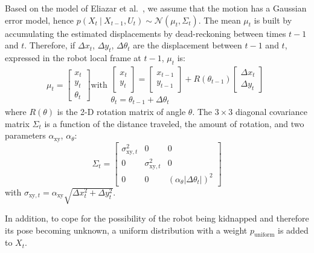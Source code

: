 \documentclass[letterpaper, 10pt, conference]{ieeeconf}
\begin{document}
Based on the model of Eliazar et al.~\cite{eliazar2004motionmodel}, we assume that the motion has a Gaussian error model, hence $p(X_t~|~X_{t-1}, U_{t})\sim\mathcal{N}(\mu_t,\Sigma_t)$.
The mean $\mu_t$ is built by accumulating the estimated displacements by dead-reckoning between times $t-1$ and $t$.
Therefore, if $\Delta x_t$, $\Delta y_t$, $\Delta \theta_t$ are the displacement between $t-1$ and $t$, expressed in the robot local frame at $t-1$, $\mu_t$ is:
\begin{equation*}
\mu_t =
\left[ \begin{array}{c} x_t \\ y_t \\ \theta_t \end{array} \right]
\text{with}
\begin{array}{c}
\left[ \begin{array}{c} x_t \\ y_t \end{array} \right] =
\left[ \begin{array}{c} x_{t-1} \\ y_{t-1} \end{array} \right] +
R(\theta_{t-1})
\left[ \begin{array}{c} \Delta x_{t} \\ \Delta y_{t} \end{array} \right]
\\
\theta_t = \theta_{t-1} + \Delta \theta_t
\end{array}
\end{equation*}
where $R(\theta)$ is the 2-D rotation matrix of angle $\theta$.
The $3\times3$ diagonal covariance matrix $\Sigma_t$ is a function of the distance traveled, the amount of rotation, and two parameters $\alpha_\mathrm{xy}$, $\alpha_\theta$:
\begin{equation*}
\Sigma_t=\begin{bmatrix} \sigma_{\mathrm{xy},t}^2 & 0 & 0 \\ 0 & \sigma_{\mathrm{xy},t}^2 & 0 \\ 0 & 0 & (\alpha_\theta | \Delta \theta_t |)^2 \end{bmatrix}
\end{equation*}
with $ \sigma_{\mathrm{xy},t} = \alpha_\mathrm{xy} \sqrt{\Delta x_{t}^2 + \Delta y_{t}^2}$.

In addition, to cope for the possibility of the robot being kidnapped and therefore its pose becoming unknown, a uniform distribution with a weight $p_\mathrm{uniform}$ is added to $X_t$.
\end{document}
